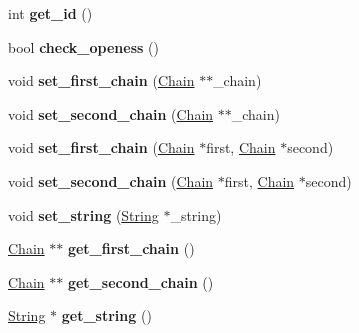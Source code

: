 \begin{DoxyCompactItemize}
\mbox{\label{class_hourglass_a373c6224472e45495cb52770a34f6134}} 
int {\bfseries get\+\_\+id} ()
\item 
\mbox{\label{class_hourglass_a41d7c4761a55e0e551efa6122fa83d90}} 
bool {\bfseries check\+\_\+openess} ()
\item 
\mbox{\label{class_hourglass_ac3178f1adc01ca57f53d17267dcfdca9}} 
void {\bfseries set\+\_\+first\+\_\+chain} (\mbox{\hyperlink{class_chain}{Chain}} $\ast$$\ast$\+\_\+chain)
\item 
\mbox{\label{class_hourglass_a17b9cd5223af3b31eb3b67fe58d45767}} 
void {\bfseries set\+\_\+second\+\_\+chain} (\mbox{\hyperlink{class_chain}{Chain}} $\ast$$\ast$\+\_\+chain)
\item 
\mbox{\label{class_hourglass_aa24c0f23cd2026a6eb8ffa4543083bd6}} 
void {\bfseries set\+\_\+first\+\_\+chain} (\mbox{\hyperlink{class_chain}{Chain}} $\ast$first, \mbox{\hyperlink{class_chain}{Chain}} $\ast$second)
\item 
\mbox{\label{class_hourglass_a13558ffb41e13a062a84a6fae909d47b}} 
void {\bfseries set\+\_\+second\+\_\+chain} (\mbox{\hyperlink{class_chain}{Chain}} $\ast$first, \mbox{\hyperlink{class_chain}{Chain}} $\ast$second)
\item 
\mbox{\label{class_hourglass_afd28af283859f50ce03f127cc0648a6f}} 
void {\bfseries set\+\_\+string} (\mbox{\hyperlink{class_string}{String}} $\ast$\+\_\+string)
\item 
\mbox{\label{class_hourglass_a285fd737da02df0de8310f0ad243426d}} 
\mbox{\hyperlink{class_chain}{Chain}} $\ast$$\ast$ {\bfseries get\+\_\+first\+\_\+chain} ()
\item 
\mbox{\label{class_hourglass_a7128b5838e829b76cc7fe5ce41deefa7}} 
\mbox{\hyperlink{class_chain}{Chain}} $\ast$$\ast$ {\bfseries get\+\_\+second\+\_\+chain} ()
\item 
\mbox{\label{class_hourglass_a878efa80451c642736f52084c9f36731}} 
\mbox{\hyperlink{class_string}{String}} $\ast$ {\bfseries get\+\_\+string} ()

\end{DoxyCompactItemize}
